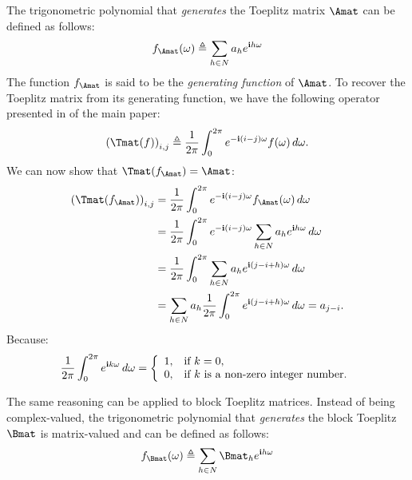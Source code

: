 The trigonometric polynomial that \emph{generates} the Toeplitz matrix $\Amat$ can be defined as follows:
\begin{equation}
  f_{\Amat}(\omega) \triangleq \sum_{h \in N} a_h e^{\ci h \omega}
\end{equation}
The function $f_{\Amat}$ is said to be the \emph{generating function} of $\Amat$. To recover the Toeplitz matrix from its generating function, we have the following operator presented in  of the main paper:
\begin{equation} \label{equation:toeplitz_operator}
  \leftmat \Tmat(f) \rightmat_{i, j} \triangleq  \frac{1}{2\pi} \int_0^{2\pi} e^{-\ci (i - j)\omega} f(\omega) \,d\omega .
\end{equation}
We can now show that $\Tmat(f_{\Amat}) = \Amat$: 
\begingroup
\allowdisplaybreaks
\begin{align}
    \leftmat \Tmat(f_\Amat) \rightmat_{i, j} &= \frac{1}{2\pi} \int_0^{2\pi} e^{-\ci (i-j)\omega} f_{\Amat}(\omega) \,d\omega  \\
    &= \frac{1}{2\pi} \int_0^{2\pi} e^{-\ci (i-j) \omega} \sum_{h \in N} a_h e^{\ci h \omega} \,d\omega  \\
    &= \frac{1}{2\pi} \int_0^{2\pi} \sum_{h \in N} a_h e^{\ci (j - i + h) \omega} \,d\omega  \\
    &= \sum_{h \in N} a_h \frac{1}{2\pi} \int_0^{2\pi} e^{\ci (j - i + h) \omega} \,d\omega 
    = a_{j-i} .
\end{align}
\endgroup
Because:
\begin{equation}
    \frac{1}{2\pi} \int_0^{2\pi} e^{\ci k \omega} \,d\omega = \left\{
                \begin{array}{ll}
                  1, & \text{if}\ k = 0, \\
                  0, & \text{if}\ k\ \text{is a non-zero integer number.}
                \end{array}
                \right.
\end{equation}

The same reasoning can be applied to block Toeplitz matrices. Instead of being complex-valued, the trigonometric polynomial that {\em generates} the block Toeplitz $\Bmat$ is matrix-valued and can be defined as follows:
\begin{equation}
  f_{\Bmat}(\omega) \triangleq \sum_{h \in N} \Bmat_h e^{\ci h \omega}
\end{equation}

